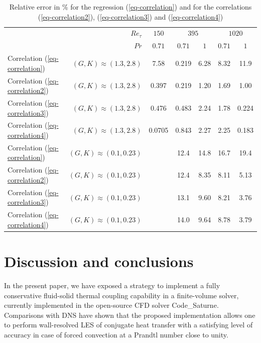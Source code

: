 \documentclass{svjour3}                     %
\begin{document}
\begin{table}[h]
\caption{Relative error in \% for the regression (\ref{eq-correlation}) and for the correlations (\ref{eq-correlation2}), (\ref{eq-correlation3}) and (\ref{eq-correlation4})}
\label{tab-final_error}
\begin{center}
\begin{tabular}{|lr|c|cc|cc|}
\hline
&$Re_\tau$ & $150$& \multicolumn{2}{c|}{$395$} & \multicolumn{2}{c|}{$1020$} \\
&$Pr$ & $0.71$ & $0.71$ & $1$ & $0.71$ & $1$\\
\hline
Correlation (\ref{eq-correlation}) & $(G,K)\approx(1.3,2.8)$ & 7.58 & 0.219 & 6.28 & 8.32 & 11.9 \\
Correlation (\ref{eq-correlation2}) & $(G,K)\approx(1.3,2.8)$ & 0.397 & 0.219 & 1.20 & 1.69 & 1.00 \\
Correlation (\ref{eq-correlation3}) & $(G,K)\approx(1.3,2.8)$ & 0.476 & 0.483 & 2.24 & 1.78 & 0.224 \\
Correlation (\ref{eq-correlation4}) & $(G,K)\approx(1.3,2.8)$ & 0.0705 & 0.843 & 2.27 & 2.25 & 0.183 \\
\hline
Correlation (\ref{eq-correlation}) & $(G,K)\approx(0.1,0.23)$ & & 12.4 & 14.8 & 16.7 & 19.4 \\
Correlation (\ref{eq-correlation2}) & $(G,K)\approx(0.1,0.23)$ & & 12.4 & 8.35 & 8.11 & 5.13 \\
Correlation (\ref{eq-correlation3}) & $(G,K)\approx(0.1,0.23)$ & & 13.1 & 9.60 & 8.21 & 3.76 \\
Correlation (\ref{eq-correlation4}) & $(G,K)\approx(0.1,0.23)$ & & 14.0 & 9.64 & 8.78 & 3.79 \\
\hline
\end{tabular}
\end{center}
\end{table}

\section{Discussion and conclusions}
\label{sec-disc_conclu}

In the present paper, we have exposed a strategy to implement a fully conservative fluid-solid thermal coupling capability in a finite-volume solver, currently implemented in the open-source CFD solver {\selectfont Code\_Saturne}.
Comparisons with DNS have shown that the proposed implementation allows one to perform wall-resolved LES of conjugate heat transfer with a satisfying level of accuracy in case of forced convection at a Prandtl number close to unity.
\end{document}
